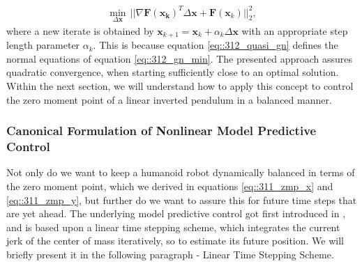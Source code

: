 \begin{align}
	\min_{\Delta\bm{x}}\,||\nabla\bm{F}(\bm{x_k})^T\Delta\bm{x}+\bm{F}(\bm{x}_k)||^2_2,
	\label{eq::312_gn_min}
\end{align}
where a new iterate is obtained by $\bm{x}_{k+1}=\bm{x}_k + \alpha_k\Delta \bm{x}$ with an appropriate step length parameter $\alpha_k$. This is because equation \ref{eq::312_quasi_gn} defines the normal equations of equation \ref{eq::312_gn_min}. The presented approach assures quadratic convergence, when starting sufficiently close to an optimal solution. Within the next section, we will understand how to apply this concept to control the zero moment point of a linear inverted pendulum in a balanced manner.
\subsubsection{Canonical Formulation of Nonlinear Model Predictive Control}
Not only do we want to keep a humanoid robot dynamically balanced in terms of the zero moment point, which we derived in equations \ref{eq::311_zmp_x} and \ref{eq::311_zmp_y}, but further do we want to assure this for future time steps that are yet ahead. The underlying model predictive control got first introduced in \cite{kajita2003biped}, and is based upon a linear time stepping scheme, which integrates the current jerk of the center of mass iteratively, so to estimate its future position. We will briefly present it in the following paragraph - Linear Time Stepping Scheme.
